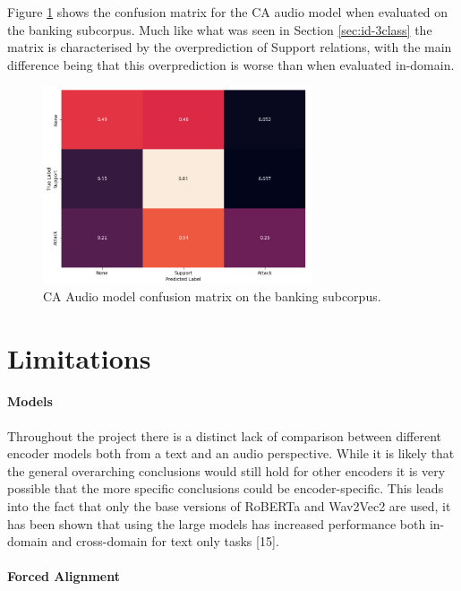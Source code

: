 \documentclass[twocolumn,twoside]{article}
\begin{document}
Figure \ref{fig:res-cd-ca-banking-3} shows the confusion matrix for the
CA audio model when evaluated on the banking subcorpus. Much like what
was seen in Section \ref{sec:id-3class} the matrix is characterised by
the overprediction of Support relations, with the main difference being
that this overprediction is worse than when evaluated in-domain.

\begin{figure}[H]
\centering
\includegraphics[width=8cm]{ca-audio-conf-mat-3class-banking}
\caption{CA Audio model confusion matrix on the banking subcorpus.\label{fig:res-cd-ca-banking-3}}
\end{figure}

\section{Limitations}\label{sec:limitations}

\paragraph{Models}\label{models}

Throughout the project there is a distinct lack of comparison between
different encoder models both from a text and an audio perspective.
While it is likely that the general overarching conclusions would still
hold for other encoders it is very possible that the more specific
conclusions could be encoder-specific. This leads into the fact that
only the base versions of RoBERTa and Wav2Vec2 are used, it has been
shown that using the large models has increased performance both
in-domain and cross-domain for text only tasks {[}15{]}.

\paragraph{Forced Alignment}\label{forced-alignment-1}
\end{document}
